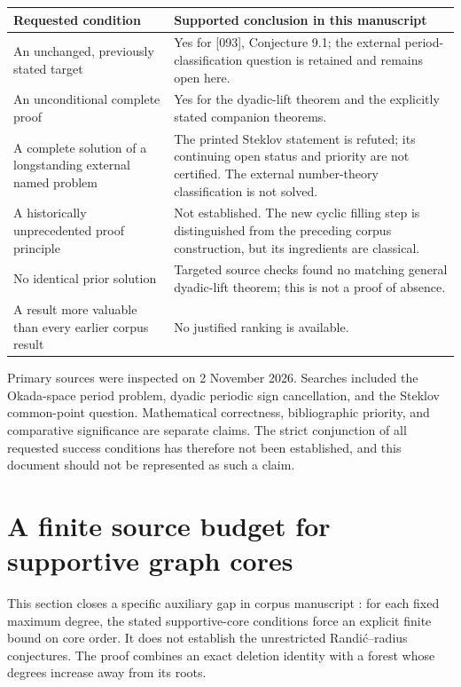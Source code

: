 \documentclass[11pt,a4paper]{article}
\theoremstyle{definition}\newtheorem{definition}[theorem]{Definition}
\theoremstyle{remark}\newtheorem{remark}[theorem]{Remark}
\begin{document}
\begin{center}\small
\begin{tabular}{p{.43\linewidth}p{.48\linewidth}}
\toprule
Requested condition & Supported conclusion in this manuscript\\
\midrule
An unchanged, previously stated target & Yes for [093], Conjecture 9.1; the external period-classification question is retained and remains open here.\\
An unconditional complete proof & Yes for the dyadic-lift theorem and the explicitly stated companion theorems.\\
A complete solution of a longstanding external named problem & The printed Steklov statement is refuted; its continuing open status and priority are not certified. The external number-theory classification is not solved.\\
A historically unprecedented proof principle & Not established. The new cyclic filling step is distinguished from the preceding corpus construction, but its ingredients are classical.\\
No identical prior solution & Targeted source checks found no matching general dyadic-lift theorem; this is not a proof of absence.\\
A result more valuable than every earlier corpus result & No justified ranking is available.\\
\bottomrule
\end{tabular}
\end{center}

Primary sources were inspected on 2 November 2026. Searches included the
Okada-space period problem, dyadic periodic sign cancellation, and the
Steklov common-point question. Mathematical correctness, bibliographic
priority, and comparative significance are separate claims. The strict
conjunction of all requested success conditions has therefore not been
established, and this document should not be represented as such a claim.

\appendix

\section{A finite source budget for supportive graph cores}
\label{sec:graph-source-budget}

This section closes a specific auxiliary gap in corpus manuscript
\cite[Remark~\texttt{rem:D6}]{Corpus087}: for each fixed maximum degree,
the stated supportive-core conditions force an explicit finite bound on
core order. It does not establish the unrestricted Randi\'c--radius
conjectures. The proof combines an exact deletion identity with a forest
whose degrees increase away from its roots.
\end{document}
